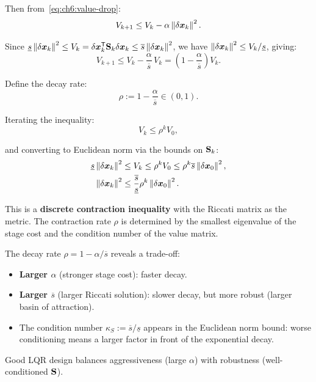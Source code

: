 Then from~\eqref{eq:ch6:value-drop}:
\begin{equation}
V_{k+1} \leq V_k - \alpha\left\lVert \delta\bm{x}_k \right\rVert^2.
\label{eq:ch6:first-ineq}
\end{equation}

Since $\underline{s}\left\lVert \delta\bm{x}_k \right\rVert^2 \leq V_k = \delta\bm{x}_k^{\mathsf{T}}\mathbf{S}_k\delta\bm{x}_k \leq \overline{s}\left\lVert \delta\bm{x}_k \right\rVert^2$, we have
$\left\lVert \delta\bm{x}_k \right\rVert^2 \leq V_k/\underline{s}$, giving:
\begin{equation}
V_{k+1} \leq V_k - \frac{\alpha}{\overline{s}}\,V_k
= \left(1-\frac{\alpha}{\overline{s}}\right)V_k.
\label{eq:ch6:exp-decay}
\end{equation}

Define the decay rate:
\begin{equation}
\rho := 1-\frac{\alpha}{\overline{s}} \in (0,1).
\label{eq:ch6:decay-rate}
\end{equation}

Iterating the inequality:
\begin{equation}
V_k \leq \rho^k V_0,
\label{eq:ch6:Vk-bound}
\end{equation}

and converting to Euclidean norm via the bounds on $\mathbf{S}_k$:
\begin{align}
\underline{s}\left\lVert \delta\bm{x}_k \right\rVert^2 &\leq V_k \leq \rho^k V_0 \leq \rho^k \overline{s}\left\lVert \delta\bm{x}_0 \right\rVert^2, \\
\left\lVert \delta\bm{x}_k \right\rVert^2 &\leq \frac{\overline{s}}{\underline{s}}\rho^k\left\lVert \delta\bm{x}_0 \right\rVert^2.
\label{eq:ch6:norm-decay}
\end{align}

This is a \textbf{discrete contraction inequality} with the Riccati matrix as the metric. The contraction rate $\rho$ is
determined by the smallest eigenvalue of the stage cost and the condition number of the value matrix.

\begin{remark}
The decay rate $\rho = 1 - \alpha/\overline{s}$ reveals a trade-off:
\begin{itemize}
\item \textbf{Larger $\alpha$} (stronger stage cost): faster decay.
\item \textbf{Larger $\overline{s}$} (larger Riccati solution): slower decay, but more robust (larger basin of attraction).
\item The condition number $\kappa_S := \overline{s}/\underline{s}$ appears in the Euclidean norm bound: worse conditioning
      means a larger factor in front of the exponential decay.
\end{itemize}

Good LQR design balances aggressiveness (large $\alpha$) with robustness (well-conditioned $\mathbf{S}$).
\end{remark}

